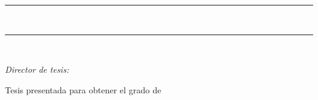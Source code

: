 \begin{titlepage}
\centering
\vspace*{1cm}

{\scshape\Large \thesisuniversity \par}
\vspace{0.3cm}
{\large \thesisfaculty \par}
\vspace{0.5cm}
{\scshape \thesisprogram \par}
\vspace{2.5cm}

\rule{\linewidth}{0.4pt}\\[0.4cm]
{\huge\bfseries \thesistitle \par}
\vspace{0.4cm}
{\Large \thesissubtitle \par}
\rule{\linewidth}{0.4pt}\\[1.5cm]

{\Large\itshape \thesisauthor \par}
\vspace{2cm}

\begin{flushright}
\textit{Director de tesis:}\\
\thesisadvisor
\end{flushright}

\vfill
{\large Tesis presentada para obtener el grado de\\
\thesisprogram \par}
\vspace{1cm}
{\large \thesisyear \par}

\end{titlepage}
\clearpage
